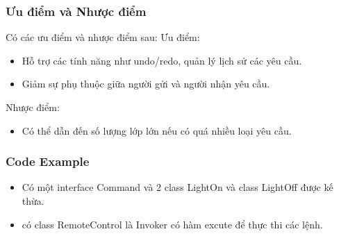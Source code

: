 \subsubsection{Ưu điểm và Nhược điểm}
Có các ưu điểm và nhược điểm sau:
Ưu điểm:
\begin{itemize}
    \item Hỗ trợ các tính năng như undo/redo, quản lý lịch sử các yêu cầu.
    \item Giảm sự phụ thuộc giữa người gửi và người nhận yêu cầu.
\end{itemize}
Nhược điểm:
\begin{itemize}
    \item Có thể dẫn đến số lượng lớp lớn nếu có quá nhiều loại yêu cầu.
\end{itemize}

\subsubsection{Code Example}
\begin{itemize}
    \item Có một interface Command và 2 class LightOn và class LightOff được kế thừa.
    \item có class RemoteControl là Invoker có hàm excute để thực thi các lệnh.
\end{itemize}
